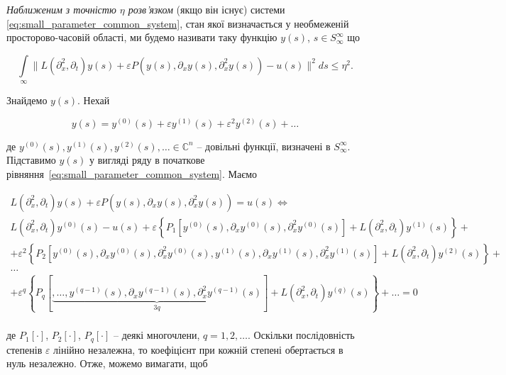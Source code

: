 \emph{Наближеним з точністю $\eta$ розв'язком} (якщо він існує) системи \eqref{eq:small_parameter_common_system}, стан
якої визначається у необмеженій просторово-часовій області, ми будемо називати таку функцію $y(s)$,
$s\in S_{\infty}^{\infty}$ що

\begin{equation}
    \label{eq:small_parameter_common_system_solution}
    \int\limits_{\infty}\parallel L(\partial_x^2, \partial_t)y(s) + \varepsilon P(y(s), \partial_x y(s), \partial_x^2 y(s))
    - u (s) \parallel^{2}ds \leq \eta^2.
\end{equation}

Знайдемо $y(s)$. Нехай

\[
y(s)=y^{(0)}(s) + \varepsilon y^{(1)}(s) + \varepsilon^2 y^{(2)}(s) + \dots
\]

де $y^{(0)}(s), y^{(1)}(s), y^{(2)}(s),\dots\in\mathbb{C}^{n}$ -- довільні функції, визначені в $S_{\infty}^{\infty}$.
Підставимо $y(s)$ у вигляді ряду в початкове рівняння~\eqref{eq:small_parameter_common_system}. Маємо

\begin{gather*}
    L(\partial_x^2, \partial_t)y(s) + \varepsilon P(y(s), \partial_x y(s), \partial_x^2 y(s)) = u(s) \Leftrightarrow\\
    L(\partial_x^2, \partial_t)y^{(0)}(s) - u(s) +
    \varepsilon \left\{ P_{1}
                    \left[
                       y^{(0)}(s), \partial_x y^{(0)}(s), \partial_x^2 y^{(0)}(s)
                    \right] +
                    L(\partial_x^2, \partial_t)y^{(1)}(s)
                \right\} +\\
    + \varepsilon^{2} \left\{ P_{2}
\left[
y^{(0)}(s), \partial_x y^{(0)}(s), \partial_x^2 y^{(0)}(s),
y^{(1)}(s), \partial_x y^{(1)}(s), \partial_x^2 y^{(1)}(s)
\right] +
L(\partial_x^2, \partial_t)y^{(2)}(s)
\right\} +\\
    \dots\\
    + \varepsilon^{q} \left\{ P_{q}
\left[
\underbrace{
    ,\dots,
    y^{(q-1)}(s), \partial_x y^{(q-1)}(s), \partial_x^2 y^{(q-1)}(s)
}_{3q}
\right]
+ L(\partial_x^2, \partial_t)y^{(q)}(s)
\right\} + \dots = 0\\
\end{gather*}

де $P_{1}[\cdot]$, $P_{2}[\cdot]$, $P_{q}[\cdot]$ -- деякі многочлени, $q=1,2,\dots$.
Оскільки послідовність степенів $\varepsilon$ лінійно незалежна, то коефіцієнт при кожній степені обертається в нуль
незалежно.
Отже, можемо вимагати, щоб

